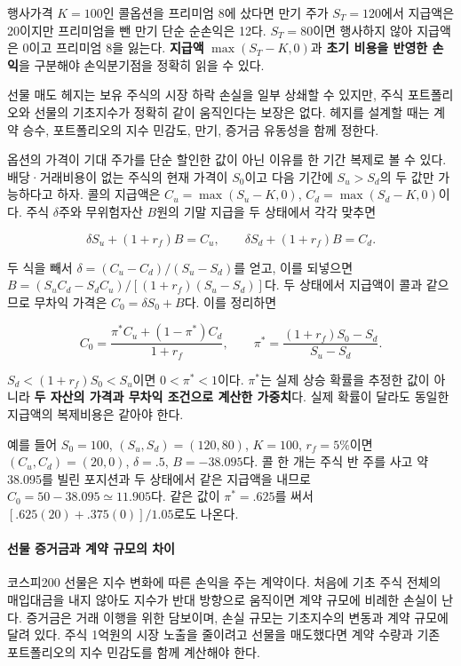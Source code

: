 \documentclass[11pt,a4paper]{article}
\begin{document}
행사가격 $K=100$인 콜옵션을 프리미엄 8에 샀다면 만기 주가 $S_T=120$에서 지급액은 20이지만 프리미엄을 뺀 만기 단순 순손익은 12다. $S_T=80$이면 행사하지 않아 지급액은 0이고 프리미엄 8을 잃는다. \textbf{지급액} $\max(S_T-K,0)$과 \textbf{초기 비용을 반영한 손익}을 구분해야 손익분기점을 정확히 읽을 수 있다.
\par

선물 매도 헤지는 보유 주식의 시장 하락 손실을 일부 상쇄할 수 있지만, 주식 포트폴리오와 선물의 기초지수가 정확히 같이 움직인다는 보장은 없다. 헤지를 설계할 때는 계약 승수, 포트폴리오의 지수 민감도, 만기, 증거금 유동성을 함께 정한다.
\par

옵션의 가격이 기대 주가를 단순 할인한 값이 아닌 이유를 한 기간 복제로 볼 수 있다. 배당·거래비용이 없는 주식의 현재 가격이 $S_0$이고 다음 기간에 $S_u>S_d$의 두 값만 가능하다고 하자. 콜의 지급액은 $C_u=\max(S_u-K,0)$, $C_d=\max(S_d-K,0)$이다. 주식 $\delta$주와 무위험자산 $B$원의 기말 지급을 두 상태에서 각각 맞추면
\par

\[
\delta S_u+(1+r_f)B=C_u,\qquad
\delta S_d+(1+r_f)B=C_d.
\]

두 식을 빼서 $\delta=(C_u-C_d)/(S_u-S_d)$를 얻고, 이를 되넣으면 $B=(S_uC_d-S_dC_u)/[(1+r_f)(S_u-S_d)]$다. 두 상태에서 지급액이 콜과 같으므로 무차익 가격은 $C_0=\delta S_0+B$다. 이를 정리하면
\par

\[
C_0=\frac{\pi^*C_u+(1-\pi^*)C_d}{1+r_f},\qquad
\pi^*=\frac{(1+r_f)S_0-S_d}{S_u-S_d}.
\]

$S_d<(1+r_f)S_0<S_u$이면 $0<\pi^*<1$이다. $\pi^*$는 실제 상승 확률을 추정한 값이 아니라 \textbf{두 자산의 가격과 무차익 조건으로 계산한 가중치}다. 실제 확률이 달라도 동일한 지급액의 복제비용은 같아야 한다.
\par

예를 들어 $S_0=100$, $(S_u,S_d)=(120,80)$, $K=100$, $r_f=5\%$이면 $(C_u,C_d)=(20,0)$, $\delta=.5$, $B=-38.095$다. 콜 한 개는 주식 반 주를 사고 약 38.095를 빌린 포지션과 두 상태에서 같은 지급액을 내므로 $C_0=50-38.095\simeq11.905$다. 같은 값이 $\pi^*=.625$를 써서 $[.625(20)+.375(0)]/1.05$로도 나온다.
\par

\paragraph{선물 증거금과 계약 규모의 차이}

코스피200 선물은 지수 변화에 따른 손익을 주는 계약이다. 처음에 기초 주식 전체의 매입대금을 내지 않아도 지수가 반대 방향으로 움직이면 계약 규모에 비례한 손실이 난다. 증거금은 거래 이행을 위한 담보이며, 손실 규모는 기초지수의 변동과 계약 규모에 달려 있다. 주식 1억원의 시장 노출을 줄이려고 선물을 매도했다면 계약 수량과 기존 포트폴리오의 지수 민감도를 함께 계산해야 한다.
\par
\end{document}
